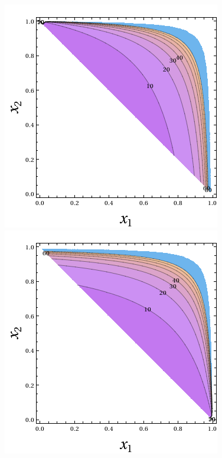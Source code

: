 \begin{figure}[h!]
\begin{center}
\begin{minipage}{0.40\linewidth}
\includegraphics[width=\linewidth]{images/ms1.png}
\end{minipage}%
\hfill
\begin{minipage}{0.40\linewidth}
\includegraphics[width=\linewidth]{images/sw.png}

\end{minipage}
\end{center}
\end{figure}

